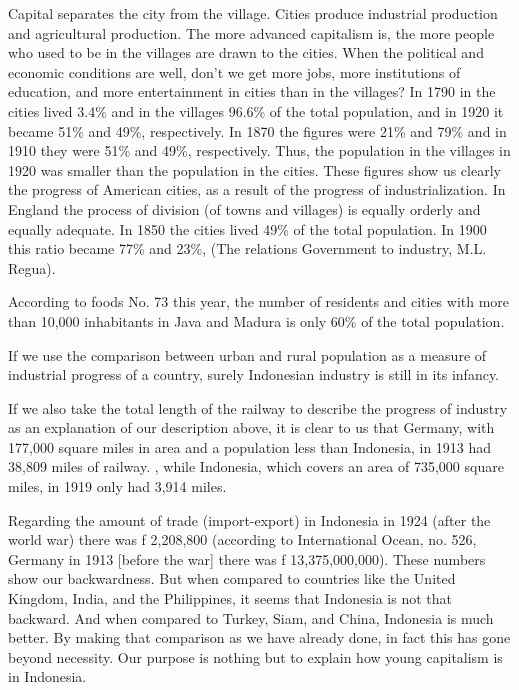 Capital separates the city from the village. Cities produce industrial production 
and agricultural production. The more advanced capitalism is, the more people who 
used to be in the villages are drawn to the cities. When the political and 
economic conditions are well, don't we get more jobs, more institutions of 
education, and more entertainment in cities than in the villages? In 1790 in the 
cities lived 3.4\% and in the villages 96.6\% of the total population, and in 1920 it 
became 51\% and 49\%, respectively. In 1870 the figures were 21\% and 79\% and in 1910 
they were 51\% and 49\%, respectively. Thus, the population in the villages in 1920 was 
smaller than the population in the cities. These figures show us clearly the progress of 
American cities, as a result of the progress of industrialization. In England 
the process of division (of towns and villages) is equally orderly and equally 
adequate. In 1850 the cities lived 49\% of the total population. 
In 1900 this ratio became 77\% and 23\%, (The relations Government to industry, M.L. Regua).\vskip 0.2in

According to foods No. 73 this year, the number of residents and 
cities with more than 10,000 inhabitants in Java and Madura is only 60\% of the total population.\vskip 0.2in

If we use the comparison between urban and rural population as a measure of 
industrial progress of a country, surely Indonesian industry is still in its infancy.\vskip 0.2in

If we also take the total length of the railway to describe the progress of 
industry as an explanation of our description above, it is clear to us that Germany, 
with 177,000 square miles in area and a population less than Indonesia, in 1913 had 
38,809 miles of railway. , while Indonesia, which covers an area of 735,000 square miles, in 1919 only had 3,914 miles.\vskip 0.2in

Regarding the amount of trade (import-export) in Indonesia in 1924 
(after the world war) there was f 2,208,800 (according to International Ocean, 
no. 526, Germany in 1913 [before the war] there was f 13,375,000,000). 
These numbers show our backwardness. But when compared to countries like the 
United Kingdom, India, and the Philippines, it seems that Indonesia is not 
that backward. And when compared to Turkey, Siam, and China, Indonesia 
is much better. By making that comparison as we have already done, in fact 
this has gone beyond necessity. Our purpose is nothing but to explain how young capitalism is in Indonesia.\vskip 0.2in


